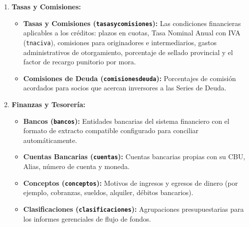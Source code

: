 \documentclass[12pt,a4paper]{article}
\renewcommand{\_}{\textunderscore\allowbreak}
\begin{document}
\begin{enumerate}
    \item \textbf{Tasas y Comisiones:}
          \begin{itemize}\raggedright
              \item \textbf{Tasas y Comisiones (\texttt{tasas\_y\_comisiones}):} Las condiciones financieras aplicables a los créditos: plazos en cuotas, Tasa Nominal Anual con IVA (\texttt{tna\_c\_iva}), comisiones para originadores e intermediarios, gastos administrativos de otorgamiento, porcentaje de sellado provincial y el factor de recargo punitorio por mora.
              \item \textbf{Comisiones de Deuda (\texttt{comisiones\_deuda}):} Porcentajes de comisión acordados para socios que acercan inversores a las Series de Deuda.
          \end{itemize}

    \item \textbf{Finanzas y Tesorería:}
          \begin{itemize}
              \item \textbf{Bancos (\texttt{bancos}):} Entidades bancarias del sistema financiero con el formato de extracto compatible configurado para conciliar automáticamente.
              \item \textbf{Cuentas Bancarias (\texttt{cuentas}):} Cuentas bancarias propias con su CBU, Alias, número de cuenta y moneda.
              \item \textbf{Conceptos (\texttt{conceptos}):} Motivos de ingresos y egresos de dinero (por ejemplo, cobranzas, sueldos, alquiler, débitos bancarios).
              \item \textbf{Clasificaciones (\texttt{clasificaciones}):} Agrupaciones presupuestarias para los informes gerenciales de flujo de fondos.
          \end{itemize}


\end{enumerate}
\end{document}
